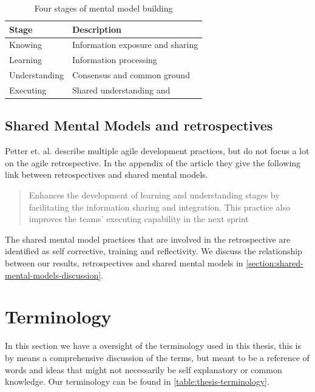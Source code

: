 \begin{table}[!h]
	\begin{centering}
	\caption{Four stages of mental model building}
	\label{table:stages-mental-model}
	\begin{tabular}{l | p{}}

	\hline
	Stage & Description \\
	\hline
	Knowing &  Information exposure and sharing\\
	Learning & Information processing \\
	Understanding & Consensus and common ground \\
	Executing & Shared understanding and  \\
	\hline
	
\end{tabular}
\end{centering}
\end{table}

	
\subsection{Shared Mental Models and retrospectives}

Petter et. al. \cite{Petter2013} describe multiple agile development practices, but do not focus a lot on the agile retrospective. In the appendix of the article they give the following link between retrospectives and shared mental models.

\begin{quote}
Enhances the development of learning and understanding stages by facilitating the information sharing and integration. This practice also improves the teams’ executing capability in the next sprint
\end{quote}

The shared mental model practices that are involved in the retrospective are identified as self corrective, training and reflectivity. We discuss the relationship between our results, retrospectives and shared mental models in \autoref{section:shared-mental-models-discussion}.

\clearpage 

\section{Terminology}
In this section we have a oversight of the terminology used in this thesis, this is by means a comprehensive discussion of the terms, but meant to be a reference of words and ideas that might not necessarily be self explanatory or common knowledge. Our terminology can be found in \autoref{table:thesis-terminology}.

